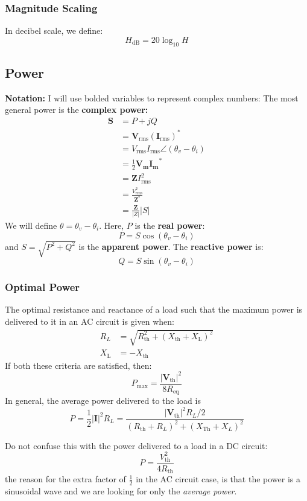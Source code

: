 \documentclass{article}
\begin{document}
\subsubsection{Magnitude Scaling}
In decibel scale, we define:
\begin{equation}
    H_\text{dB} = 20\log_{10}H
\end{equation}
\subsection{Power}
\textbf{Notation:} I will use bolded variables to represent complex numbers: The most general power is the \textbf{complex power:}
\begin{align}
    \bm{S} &= P + jQ \\
    &= \bm{V}_\text{rms}\left(\bm{I}_\text{rms}\right)^* \\ 
    &= V_\text{rms}I_\text{rms} \angle (\theta_v-\theta_i) \\ 
    &= \frac{1}{2}\bm{V_m}\bm{I_m}^* \\ 
    &= \bm{Z}I_\text{rms}^2 \\ 
    &= \frac{V_\text{rms}^2}{\bm{Z}^*} \\ 
    &= \frac{\bm{Z}}{|Z|}|S|
\end{align}
We will define $\theta=\theta_v-\theta_i$. Here, $P$ is the \textbf{real power}:
\begin{equation}
    P = S\cos(\theta_v-\theta_i)
\end{equation}
and $S=\sqrt{P^2+Q^2}$ is the \textbf{apparent power}. The \textbf{reactive power} is:
\begin{equation}
    Q = S\sin(\theta_v-\theta_i)
\end{equation}
\subsubsection{Optimal Power}
The optimal resistance and reactance of a load such that the maximum power is delivered to it in an AC circuit is given when:
\begin{align}
    R_L &= \sqrt{R_\text{th}^2 + (X_\text{th}+X_\text{L})^2} \\ 
    X_\text{L} &= - X_\text{th}
\end{align}
If both these criteria are satisfied, then:
\begin{equation}
    P_\text{max} = \frac{|\bm{V}_\text{th}|^2}{8R_\text{eq}}
\end{equation}
In general, the average power delivered to the load is
\begin{equation}
    P = \frac{1}{2}|\bm{I}|^2 R_L = \frac{|\bm{V}_\text{th}|^2R_L/2}{(R_\text{th}+R_L)^2+(X_\text{Th}+X_L)^2}
\end{equation}
\begin{warning}
    Do not confuse this with the power delivered to a load in a DC circuit:
    \begin{equation}
        P = \frac{V_\text{th}^2}{4R_\text{th}}
    \end{equation}
    the reason for the extra factor of $\frac{1}{2}$ in the AC circuit case, is that the power is a sinusoidal wave and we are looking for only the \textit{average power}.
\end{warning}
\end{document}
